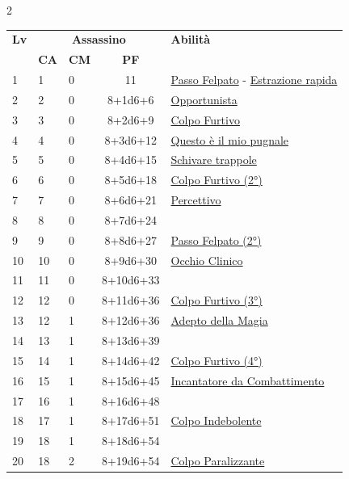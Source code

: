 {\begin{multicols}{2}


\noindent\begin{tabularx}{\linewidth}{p{0.55cm}|p{0.55cm}p{0.55cm}c|X|}
	\toprule
 \rowcolor{gray!20}	\textbf{Lv} & \multicolumn{3}{c|}{\textbf{Assassino}} & \textbf{Abilità} \\
& \centering\arraybackslash \textbf{CA} & \centering\arraybackslash \textbf{CM} & \centering\arraybackslash \textbf{PF} & \\
	\toprule
	1 & 1 & 0 & 11 & \hyperlink{Passo Felpato}{Passo Felpato} - \hyperlink{Estrazione rapida}{Estrazione rapida}\\
	\rowcolor{gray!20}2 & 2 & 0 & 8+1d6+6 & \hyperlink{Opportunista}{Opportunista}\\
	3 & 3 & 0 & 8+2d6+9 & \hyperlink{Colpo Furtivo}{Colpo Furtivo}\\
	\rowcolor{gray!20}4 & 4 & 0 & 8+3d6+12 & \hyperlink{Questo è il mio pugnale}{Questo è il mio pugnale}\\
	5 & 5 & 0 & 8+4d6+15 & \hyperlink{Schivare trappole}{Schivare trappole}\\
	\rowcolor{gray!20}6 & 6 & 0 & 8+5d6+18 & \hyperlink{Colpo Furtivo}{Colpo Furtivo (2°)}\\
	7 & 7 & 0 & 8+6d6+21 & \hyperlink{Percettivo}{Percettivo}\\
	\rowcolor{gray!20}8 & 8 & 0 & 8+7d6+24 & \\
	9 & 9 & 0 & 8+8d6+27 & \hyperlink{Passo Felpato}{Passo Felpato (2°)}\\
	\rowcolor{gray!20}10 & 10 & 0 & 8+9d6+30 & \hyperlink{Occhio Clinico}{Occhio Clinico}\\
	11 & 11 & 0 & 8+10d6+33 & \\
	\rowcolor{gray!20}12 & 12 & 0 & 8+11d6+36 & \hyperlink{Colpo Furtivo}{Colpo Furtivo (3°)}\\
	13 & 12 & 1 & 8+12d6+36 & \hyperlink{Adepto della Magia}{Adepto della Magia}\\
	\rowcolor{gray!20}14 & 13 & 1 & 8+13d6+39 & \\
	15 & 14 & 1 & 8+14d6+42 & \hyperlink{Colpo Furtivo}{Colpo Furtivo (4°)}\\
	\rowcolor{gray!20}16 & 15 & 1 & 8+15d6+45 & \hyperlink{Incantatore da Combattimento}{Incantatore da Combattimento}\\
	17 & 16 & 1 & 8+16d6+48 & \\
	\rowcolor{gray!20}18 & 17 & 1 & 8+17d6+51 & \hyperlink{Colpo Indebolente}{Colpo Indebolente}\\
	19 & 18 & 1 & 8+18d6+54 & \\
	\rowcolor{gray!20}20 & 18 & 2 & 8+19d6+54 & \hyperlink{Colpo Paralizzante}{Colpo Paralizzante}\\
\end{tabularx}


\end{multicols}}
